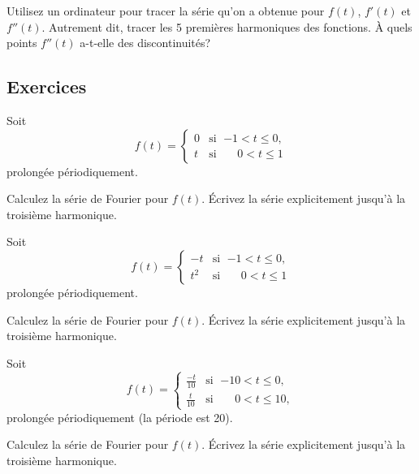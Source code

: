 \begin{exercise}
Utilisez un ordinateur pour tracer la série qu'on a obtenue pour $f(t)$, $f'(t)$ et
$f''(t)$.  Autrement dit, tracer les 5 premières harmoniques des fonctions. À quels
 points  $f''(t)$ a-t-elle des discontinuités?
\end{exercise}

\subsection{Exercices}

\begin{exercise}
Soit
\begin{equation*}
f(t) =
\begin{cases}
0 & \text{si } \; {-1} < t \leq 0 , \\
t & \text{si } \; \phantom{-}0 < t \leq  1 
\end{cases}
\end{equation*}
prolongée périodiquement.
\begin{tasks}
\task Calculez la série de Fourier pour $f(t)$.
\task Écrivez la série explicitement jusqu'à la troisième harmonique.
\end{tasks}
\end{exercise}

\begin{exercise}
Soit
\begin{equation*}
f(t) =
\begin{cases}
-t & \text{si } \; {-1} < t \leq 0 , \\
t^2 & \text{si } \; \phantom{-}0 < t \leq  1 
\end{cases}
\end{equation*}
prolongée périodiquement.

\begin{tasks}
\task Calculez la série de Fourier pour $f(t)$.
\task Écrivez la série explicitement jusqu'à la troisième harmonique.
\end{tasks}
\end{exercise}

\begin{exercise}
Soit
\begin{equation*}
f(t) =
\begin{cases}
\frac{-t}{10} & \text{si } \; {-10} < t \leq 0 , \\
\frac{t}{10} & \text{si } \; \phantom{-1}0 < t \leq  10 ,
\end{cases}
\end{equation*}
prolongée périodiquement (la période est 20).
\begin{tasks}
\task Calculez la série de Fourier pour $f(t)$.
\task Écrivez la série explicitement jusqu'à la troisième harmonique.
\end{tasks}
\end{exercise}

